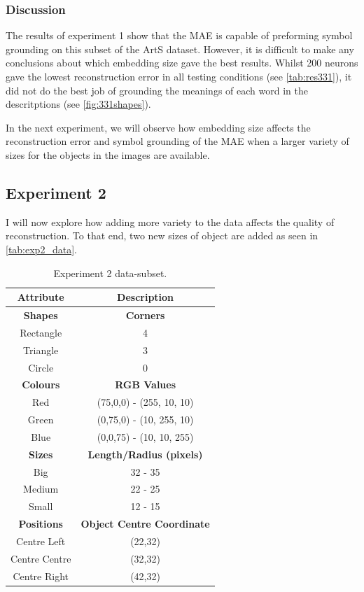 \subsubsection{Discussion}
The results of experiment 1 show that the \ac{MAE} is capable of preforming symbol grounding on this subset of the ArtS dataset. However, it is difficult to make any conclusions about which embedding size gave the best results. Whilst 200 neurons gave the lowest reconstruction error in all testing conditions (see \autoref{tab:res331}), it did not do the best job of grounding the meanings of each word in the descritptions (see \autoref{fig:331shapes}). 

In the next experiment, we will observe how embedding size affects the reconstruction error and symbol grounding of the \ac{MAE} when a larger variety of sizes for the objects in the images are available.


\newpage
\subsection{Experiment 2}
I will now explore how adding more variety to the data affects the quality of reconstruction. To that end, two new sizes of object are added as seen in \autoref{tab:exp2_data}. 

\begin{table}[ht]
\centering
\begin{tabular}{|c|c|}
\hline
\textbf{Attribute} & \textbf{Description} \\ \hline \hline
\textbf{Shapes} & \textbf{Corners} \\ \hline
Rectangle & 4\\ \hline
Triangle & 3\\ \hline
Circle & 0\\ \hline 

\textbf{Colours} & \textbf{RGB Values}	\\ \hline	
Red & (75,0,0) - (255, 10, 10)\\ \hline
Green  & (0,75,0) - (10, 255, 10)\\ \hline
Blue   & (0,0,75) - (10, 10, 255)\\ \hline


\textbf{Sizes} & 	\textbf{Length/Radius (pixels)} \\ \hline			  
Big    & 32 - 35  \\ \hline
Medium & 22 - 25 \\ \hline
Small  & 12 - 15 \\ \hline 

\textbf{Positions} & \textbf{Object Centre Coordinate}	\\ \hline					  
Centre Left &(22,32)\\ \hline
Centre Centre & (32,32)\\ \hline
Centre Right &(42,32)\\ \hline				
\end{tabular}
\caption{Experiment 2 data-subset.}
\label{tab:exp2_data} 
\end{table}



